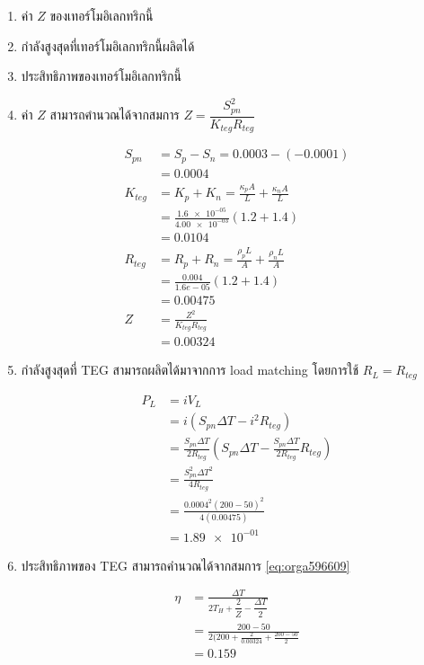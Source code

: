 \documentclass[a4paper,nobib,openany]{tufte-book}
\begin{document}
\begin{enumerate}
\item ค่า \(Z\) ของเทอร์โมอิเลกทริกนี้

\item กำลังสูงสุดที่เทอร์โมอิเลกทริกนี้ผลิตได้

\item ประสิทธิภาพของเทอร์โมอิเลกทริกนี้

\item ค่า \(Z\) สามารถคำนวณได้จากสมการ
\(Z = \dfrac{S_{pn}^2}{K_{teg} R_{teg}}\)

\begin{align*}
S_{pn} &= S_p - S_n =0.0003- (-0.0001) \\
&= 0.0004\\
K_{teg} &= K_p + K_n = \frac{\kappa_p A}{L} + \frac{\kappa_n A}{L} \\
&= \frac{ \num{1.6e-05}}{ \num{4.00e-03}} \left(1.2+1.4\right) \\
&=0.0104\\
R_{teg} &= R_p + R_n = \frac{\rho_p L}{A} + \frac{\rho_n L}{A} \\
&= \frac{0.004}{1.6e-05} \left(\num{1.2}+\num{1.4}\right) \\
&=0.00475\\
Z &= \frac{Z^2}{K_{teg}R_{teg}} \\
&=0.00324
\end{align*}

\item กำลังสูงสุดที่ TEG สามารถผลิตได้มาจากการ load matching โดยการใช้
\(R_L = R_{teg}\)

\begin{align*}
P_L &= i V_L \\
&= i \left( S_{pn} \Delta T - i^2 R_{teg} \right) \\
&= \frac{S_{pn} \Delta T}{2 R_{teg}} \left( S_{pn} \Delta T -  \frac{S_{pn} \Delta T}{2 R_{teg}} R_{teg} \right) \\
&= \frac{ S_{pn}^2 \Delta T^2 }{4 R_{teg}} \\
&= \frac{0.0004^2 (200 - 50)^2}{4 (0.00475)} \\
&=\num{1.89e-01}
\end{align*}

\item ประสิทธิภาพของ TEG สามารถคำนวณได้จากสมการ
\ref{eq:orga596609}

\begin{align*}
\eta &= \frac{ \Delta T }{ 2 T_H + \dfrac{2}{Z} - \dfrac{ \Delta T }{ 2 } } \\
&= \frac{200-50}{ 2(200 + \frac{2}{0.00324} + \frac{200-50}{2}} \\
&=0.159
\end{align*}
\end{enumerate}
\end{document}
